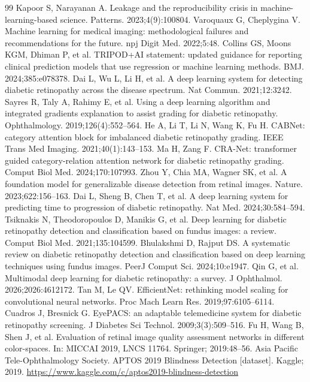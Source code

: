 \begin{thebibliography}{99}
 Kapoor S, Narayanan A. Leakage and the reproducibility crisis in machine-learning-based science. Patterns. 2023;4(9):100804.
 Varoquaux G, Cheplygina V. Machine learning for medical imaging: methodological failures and recommendations for the future. npj Digit Med. 2022;5:48.
 Collins GS, Moons KGM, Dhiman P, et al. TRIPOD+AI statement: updated guidance for reporting clinical prediction models that use regression or machine learning methods. BMJ. 2024;385:e078378.
 Dai L, Wu L, Li H, et al. A deep learning system for detecting diabetic retinopathy across the disease spectrum. Nat Commun. 2021;12:3242.
 Sayres R, Taly A, Rahimy E, et al. Using a deep learning algorithm and integrated gradients explanation to assist grading for diabetic retinopathy. Ophthalmology. 2019;126(4):552--564.
 He A, Li T, Li N, Wang K, Fu H. CABNet: category attention block for imbalanced diabetic retinopathy grading. IEEE Trans Med Imaging. 2021;40(1):143--153.
 Ma H, Zang F. CRA-Net: transformer guided category-relation attention network for diabetic retinopathy grading. Comput Biol Med. 2024;170:107993.
 Zhou Y, Chia MA, Wagner SK, et al. A foundation model for generalizable disease detection from retinal images. Nature. 2023;622:156--163.
 Dai L, Sheng B, Chen T, et al. A deep learning system for predicting time to progression of diabetic retinopathy. Nat Med. 2024;30:584--594.
 Tsiknakis N, Theodoropoulos D, Manikis G, et al. Deep learning for diabetic retinopathy detection and classification based on fundus images: a review. Comput Biol Med. 2021;135:104599.
 Bhulakshmi D, Rajput DS. A systematic review on diabetic retinopathy detection and classification based on deep learning techniques using fundus images. PeerJ Comput Sci. 2024;10:e1947.
 Qin G, et al. Multimodal deep learning for diabetic retinopathy: a survey. J Ophthalmol. 2026;2026:4612172.
 Tan M, Le QV. EfficientNet: rethinking model scaling for convolutional neural networks. Proc Mach Learn Res. 2019;97:6105--6114.
 Cuadros J, Bresnick G. EyePACS: an adaptable telemedicine system for diabetic retinopathy screening. J Diabetes Sci Technol. 2009;3(3):509--516.
 Fu H, Wang B, Shen J, et al. Evaluation of retinal image quality assessment networks in different color-spaces. In: MICCAI 2019, LNCS 11764. Springer; 2019:48--56.
 Asia Pacific Tele-Ophthalmology Society. APTOS 2019 Blindness Detection [dataset]. Kaggle; 2019. \url{https://www.kaggle.com/c/aptos2019-blindness-detection}

\end{thebibliography}
